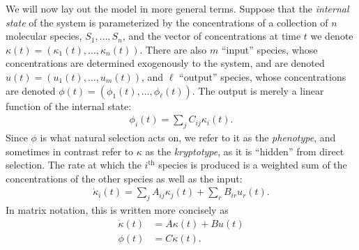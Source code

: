 \documentclass[9 pt]{article}
\newcommand{\ddt}{\dot}
\newcommand{\1}{\mathbbm{1}}
\begin{document}
We will now lay out the model in more general terms.
Suppose that the \emph{internal state} of the system
is parameterized by the concentrations of a collection of $n$ molecular species,
$S_1, \ldots, S_n$,
and the vector of concentrations at time $t$ we denote $\kappa(t)=(\kappa_1(t),\ldots,\kappa_n(t))$.
There are also $m$ ``input'' species, whose concentrations are determined
exogenously to the system,
and are denoted $u(t) = (u_1(t),\ldots,u_m(t))$,
and $\ell$ ``output'' species, whose concentrations are denoted
$\phi(t) = (\phi_1(t),\ldots,\phi_\ell(t))$.
The output is merely a linear function of the internal state:
\begin{align*}
    \phi_i(t) = \sum_j C_{ij} \kappa_i(t).
\end{align*}
Since $\phi$ is what natural selection acts on, we refer to it as the \emph{phenotype},
and sometimes in contrast refer to $\kappa$ as the \emph{kryptotype},
as it is ``hidden'' from direct selection.
The rate at which the $i^\text{th}$ species is produced
is a weighted sum of the concentrations of the other species
as well as the input:
\begin{align*}
    \ddt \kappa_i(t) = \sum_j A_{ij} \kappa_j(t) + \sum_r B_{ir} u_r(t) .
\end{align*}
In matrix notation, this is written more concisely as
\begin{align} \label{eqn:lti_system}
    \ddt \kappa(t) &= A \kappa(t) + B u(t) \\
    \phi(t) &= C \kappa(t) .
\end{align}
\end{document}
